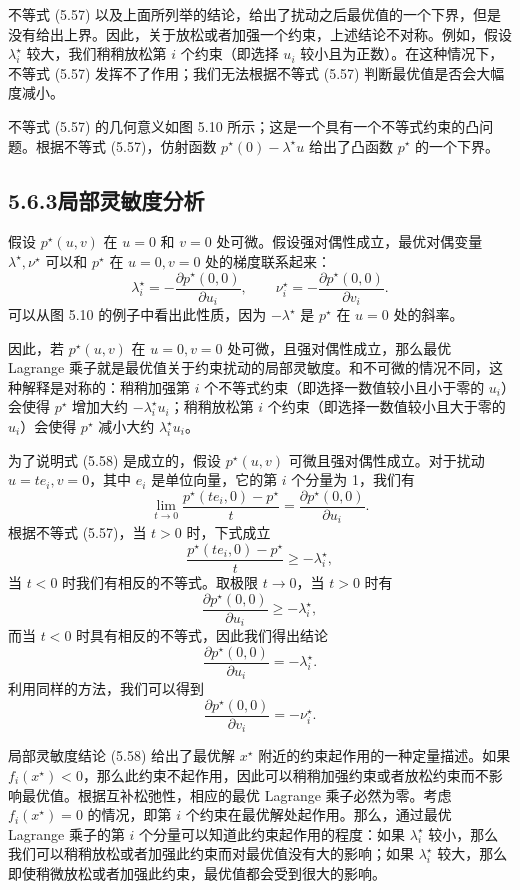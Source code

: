 \documentclass[UTF8, 12pt, fontset=fandol, oneside]{ctexart}
\begin{document}
不等式 (5.57) 以及上面所列举的结论，给出了扰动之后最优值的一个下界，但是没有给出上界。因此，关于放松或者加强一个约束，上述结论不对称。例如，假设 $\lambda_i^\star$ 较大，我们稍稍放松第 $i$ 个约束（即选择 $u_i$ 较小且为正数）。在这种情况下，不等式 (5.57) 发挥不了作用；我们无法根据不等式 (5.57) 判断最优值是否会大幅度减小。

不等式 (5.57) 的几何意义如图 5.10 所示；这是一个具有一个不等式约束的凸问题。根据不等式 (5.57)，仿射函数 $p^\star(0)-\lambda^\star u$ 给出了凸函数 $p^\star$ 的一个下界。

\subsection*{5.6.3\quad 局部灵敏度分析}

假设 $p^\star(u,v)$ 在 $u=0$ 和 $v=0$ 处可微。假设强对偶性成立，最优对偶变量 $\lambda^\star,\nu^\star$ 可以和 $p^\star$ 在 $u=0,v=0$ 处的梯度联系起来：
\begin{equation}
\lambda_i^\star=-\frac{\partial p^\star(0,0)}{\partial u_i},\qquad
\nu_i^\star=-\frac{\partial p^\star(0,0)}{\partial v_i}.
\tag{5.58}
\end{equation}
可以从图 5.10 的例子中看出此性质，因为 $-\lambda^\star$ 是 $p^\star$ 在 $u=0$ 处的斜率。

因此，若 $p^\star(u,v)$ 在 $u=0,v=0$ 处可微，且强对偶性成立，那么最优 Lagrange 乘子就是最优值关于约束扰动的局部灵敏度。和不可微的情况不同，这种解释是对称的：稍稍加强第 $i$ 个不等式约束（即选择一数值较小且小于零的 $u_i$）会使得 $p^\star$ 增加大约 $-\lambda_i^\star u_i$；稍稍放松第 $i$ 个约束（即选择一数值较小且大于零的 $u_i$）会使得 $p^\star$ 减小大约 $\lambda_i^\star u_i$。

为了说明式 (5.58) 是成立的，假设 $p^\star(u,v)$ 可微且强对偶性成立。对于扰动 $u=te_i,v=0$，其中 $e_i$ 是单位向量，它的第 $i$ 个分量为 1，我们有
\[
\lim_{t\to 0}\frac{p^\star(te_i,0)-p^\star}{t}
=\frac{\partial p^\star(0,0)}{\partial u_i}.
\]
根据不等式 (5.57)，当 $t>0$ 时，下式成立
\[
\frac{p^\star(te_i,0)-p^\star}{t}\geq -\lambda_i^\star,
\]
当 $t<0$ 时我们有相反的不等式。取极限 $t\to 0$，当 $t>0$ 时有
\[
\frac{\partial p^\star(0,0)}{\partial u_i}\geq -\lambda_i^\star,
\]
而当 $t<0$ 时具有相反的不等式，因此我们得出结论
\[
\frac{\partial p^\star(0,0)}{\partial u_i}=-\lambda_i^\star.
\]
利用同样的方法，我们可以得到
\[
\frac{\partial p^\star(0,0)}{\partial v_i}=-\nu_i^\star.
\]

局部灵敏度结论 (5.58) 给出了最优解 $x^\star$ 附近的约束起作用的一种定量描述。如果 $f_i(x^\star)<0$，那么此约束不起作用，因此可以稍稍加强约束或者放松约束而不影响最优值。根据互补松弛性，相应的最优 Lagrange 乘子必然为零。考虑 $f_i(x^\star)=0$ 的情况，即第 $i$ 个约束在最优解处起作用。那么，通过最优 Lagrange 乘子的第 $i$ 个分量可以知道此约束起作用的程度：如果 $\lambda_i^\star$ 较小，那么我们可以稍稍放松或者加强此约束而对最优值没有大的影响；如果 $\lambda_i^\star$ 较大，那么即使稍微放松或者加强此约束，最优值都会受到很大的影响。
\end{document}
